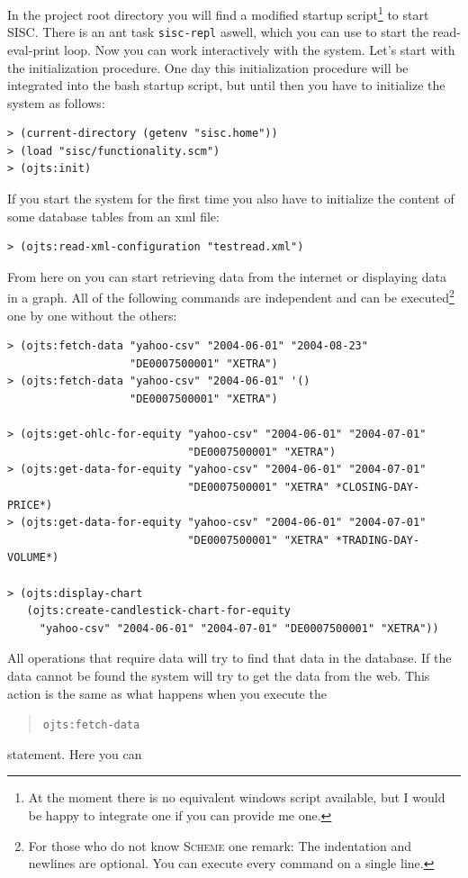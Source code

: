 \documentclass[a4paper,fleqn]{article}
\newcommand{\maketarget}         [1]{\texttt{#1}}
\newcommand{\statementtoexecute} [1]{\begin{quote}\texttt{#1}\end{quote}}
\newcommand{\name}[1]{\textsc{#1}}
\newcommand{\Scheme}{\name{Scheme}}
\begin{document}
In the project root directory you will find a modified startup
script\footnote{At the moment there is no equivalent windows script
available, but I would be happy to integrate one if you can provide me
one.} to start SISC. There is an ant task \maketarget{sisc-repl} aswell, which
you can use to start the read-eval-print loop. Now you can work
interactively with the system. Let's start with the initialization
procedure. One day this initialization procedure will be integrated
into the bash startup script, but until then you have to initialize
the system as follows:
\lstset{language=Lisp}
\begin{verbatim}
> (current-directory (getenv "sisc.home"))
> (load "sisc/functionality.scm")
> (ojts:init)
\end{verbatim}
If you start the system for the first time you also have to initialize
the content of some database tables from an xml file:
\begin{verbatim}
> (ojts:read-xml-configuration "testread.xml")
\end{verbatim}
From here on you can start retrieving data from the internet or
displaying data in a graph. All of the following commands are
independent and can be executed\footnote{For those who do not know
\Scheme{} one remark: The indentation and newlines are optional. You
can execute every command on a single line.} one by one without the
others:
\begin{verbatim}
> (ojts:fetch-data "yahoo-csv" "2004-06-01" "2004-08-23" 
                   "DE0007500001" "XETRA")
> (ojts:fetch-data "yahoo-csv" "2004-06-01" '() 
                   "DE0007500001" "XETRA")

> (ojts:get-ohlc-for-equity "yahoo-csv" "2004-06-01" "2004-07-01" 
                            "DE0007500001" "XETRA")
> (ojts:get-data-for-equity "yahoo-csv" "2004-06-01" "2004-07-01" 
                            "DE0007500001" "XETRA" *CLOSING-DAY-PRICE*)
> (ojts:get-data-for-equity "yahoo-csv" "2004-06-01" "2004-07-01" 
                            "DE0007500001" "XETRA" *TRADING-DAY-VOLUME*)
  
> (ojts:display-chart 
   (ojts:create-candlestick-chart-for-equity 
     "yahoo-csv" "2004-06-01" "2004-07-01" "DE0007500001" "XETRA"))
\end{verbatim}
All operations that require data will try to find that data in the
database. If the data cannot be found the system will try to get
the data from the web. This action is the same as what happens when
you execute the \statementtoexecute{ojts:fetch-data} statement. Here you can
\end{document}
